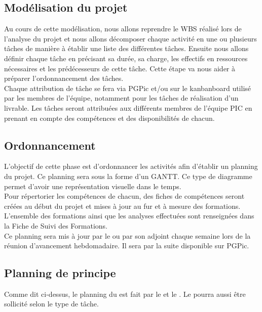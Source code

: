 \subsection{Modélisation du projet}
\label{modelisation}

Au cours de cette modélisation, nous allons reprendre le WBS réalisé lors de l’analyse du projet et nous allons décomposer chaque activité en une ou plusieurs tâches de manière à établir une liste des différentes tâches. Ensuite nous allons définir chaque tâche en précisant sa durée, sa charge, les effectifs en ressources nécessaires et les prédécesseurs de cette tâche. Cette étape va nous aider à préparer l’ordonnancement des tâches.\\

Chaque attribution de tâche se fera via PGPic et/ou sur le kanbanboard utilisé par les membres de l'équipe, notamment pour les tâches de réalisation d’un  livrable. Les tâches seront attribuées aux différents membres de l’équipe PIC en prenant en compte des compétences et des disponibilités de chacun.

\subsection{Ordonnancement}
\label{ordonnancement}

L'objectif de cette phase est d'ordonnancer les activités afin d'établir un planning du projet. Ce planning sera sous la forme d'un GANTT. Ce type de diagramme permet d’avoir une représentation visuelle dans le temps.\\

Pour répertorier les compétences de chacun, des fiches de compétences seront créées au début du projet et mises à jour au fur et à mesure des formations. L’ensemble des formations ainsi que les analyses effectuées sont renseignées dans la Fiche de Suivi des Formations.\\ 

Ce planning sera mis à jour par le \CP{}  ou par son adjoint chaque semaine lors de la réunion d’avancement hebdomadaire. Il sera par la suite disponible sur PGPic.


\subsection{Planning de principe}
\label{planning_de_principe}

Comme dit ci-dessus, le planning du \PICCourt est fait par le \CP{}  et le \CPA{}. Le \RD{}  pourra aussi être sollicité selon le type de tâche.

